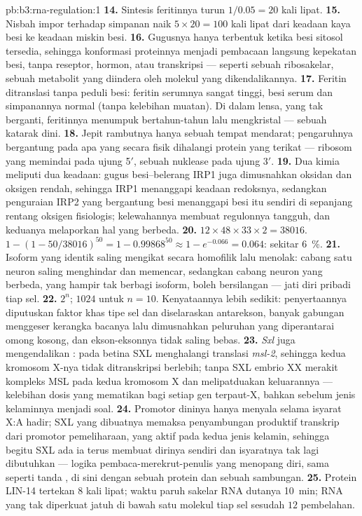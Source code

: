 \begin{solution}{pb:b3:rna-regulation:1}
\textbf{14.} Sintesis feritinnya turun $1/0.05 = 20$ kali lipat.
\textbf{15.} Nisbah impor terhadap simpanan naik $5\times 20 = 100$ kali
lipat dari keadaan kaya besi ke keadaan miskin besi.
\textbf{16.} Gugusnya hanya terbentuk ketika besi sitosol tersedia,
sehingga konformasi proteinnya menjadi pembacaan langsung kepekatan besi,
tanpa reseptor, hormon, atau transkripsi --- seperti sebuah
ribosakelar, sebuah metabolit yang diindera oleh molekul yang dikendalikannya.
\textbf{17.} Feritin ditranslasi tanpa peduli besi: feritin serumnya
sangat tinggi, besi serum dan simpanannya normal (tanpa kelebihan muatan).
Di dalam lensa, yang tak berganti, feritinnya menumpuk bertahun-tahun lalu
mengkristal --- sebuah katarak dini.
\textbf{18.} Jepit rambutnya hanya sebuah tempat mendarat; pengaruhnya
bergantung pada apa yang secara fisik dihalangi protein yang terikat ---
ribosom yang memindai pada ujung 5$'$, sebuah nuklease pada ujung 3$'$.
\textbf{19.} Dua kimia meliputi dua keadaan: gugus besi--belerang
IRP1 juga dimusnahkan oksidan dan oksigen rendah, sehingga IRP1
menanggapi keadaan redoksnya, sedangkan penguraian IRP2 yang bergantung besi
menanggapi besi itu sendiri di sepanjang rentang oksigen fisiologis;
kelewahannya membuat regulonnya tangguh, dan keduanya melaporkan hal yang
berbeda.
\textbf{20.} $12\times 48\times 33\times 2 = \num{38016}$. $1 - (1 -
50/\num{38016})^{50} = 1 - 0.99868^{50} \approx 1 - e^{-0.066} =
0.064$: sekitar \qty{6}{\%}.
\textbf{21.} Isoform yang identik saling mengikat secara homofilik lalu
menolak: cabang satu neuron saling menghindar dan memencar, sedangkan cabang
neuron yang berbeda, yang hampir tak berbagi isoform, boleh bersilangan ---
jati diri pribadi tiap sel.
\textbf{22.} $2^{n}$; $\num{1024}$ untuk $n = 10$. Kenyataannya lebih sedikit:
penyertaannya diputuskan faktor khas tipe sel dan diselaraskan
antarekson, banyak gabungan menggeser kerangka bacanya lalu dimusnahkan
peluruhan yang diperantarai omong kosong, dan ekson-eksonnya tidak saling
bebas.
\textbf{23.} \emph{Sxl} juga mengendalikan : pada betina
SXL menghalangi translasi \emph{msl-2}, sehingga kedua kromosom X-nya
tidak ditranskripsi berlebih; tanpa SXL embrio XX merakit kompleks MSL
pada kedua kromosom X dan melipatduakan keluarannya --- kelebihan dosis yang
mematikan bagi setiap gen terpaut-X, bahkan sebelum jenis kelaminnya menjadi
soal.
\textbf{24.} Promotor dininya hanya menyala selama isyarat X:A
hadir; SXL yang dibuatnya memaksa penyambungan produktif transkrip
dari promotor pemeliharaan, yang aktif pada kedua jenis kelamin, sehingga
begitu SXL ada ia terus membuat dirinya sendiri dan isyaratnya tak lagi
dibutuhkan --- logika pembaca-merekrut-penulis yang menopang diri, sama
seperti tanda , di sini dengan sebuah protein dan sebuah sambungan.
\textbf{25.} Protein LIN-14 tertekan $8$ kali lipat; waktu paruh sakelar
RNA dutanya \qty{10}{min}; RNA yang tak diperkuat jatuh di bawah satu molekul
tiap sel sesudah $12$ pembelahan.
\end{solution}
